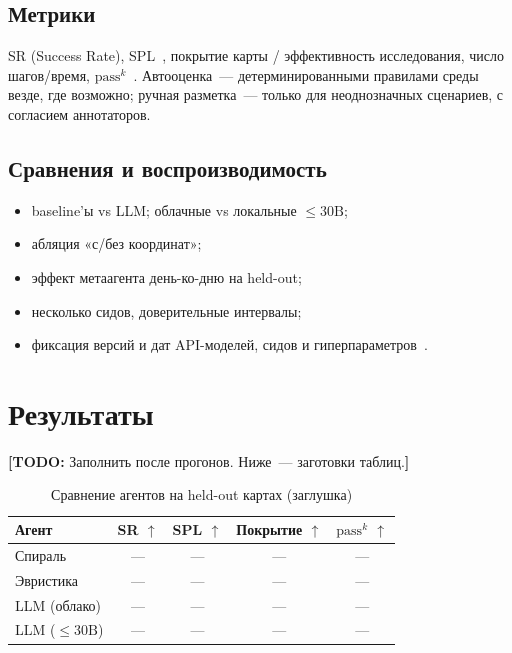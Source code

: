 \documentclass[11pt,a4paper]{article}
\newcommand{\todo}[1]{\textcolor{red!70!black}{\textbf{[TODO:} #1\textbf{]}}}
\begin{document}
\subsection{Метрики}

SR (Success Rate), SPL~\cite{anderson2018spl}, покрытие карты / эффективность
исследования, число шагов/время, \(\mathrm{pass}^k\)~\cite{taubench2024}.
Автооценка~--- детерминированными правилами среды везде, где возможно;
ручная разметка~--- только для неоднозначных сценариев, с согласием аннотаторов.

\subsection{Сравнения и воспроизводимость}

\begin{itemize}[leftmargin=*]
  \item baseline'ы vs LLM; облачные vs локальные \(\le 30\mathrm{B}\);
  \item абляция «с/без координат»;
  \item эффект метаагента день-ко-дню на held-out;
  \item несколько сидов, доверительные интервалы;
  \item фиксация версий и дат API-моделей, сидов и гиперпараметров~\cite{pineau2018reproducibility}.
\end{itemize}

\section{Результаты}
\label{sec:results}

\todo{Заполнить после прогонов. Ниже~--- заготовки таблиц.}

\begin{table}[ht]
\centering
\caption{Сравнение агентов на held-out картах (заглушка)}
\label{tab:main}
\begin{tabular}{lcccc}
\toprule
Агент & SR \(\uparrow\) & SPL \(\uparrow\) & Покрытие \(\uparrow\) & \(\mathrm{pass}^k\) \(\uparrow\) \\
\midrule
Спираль & --- & --- & --- & --- \\
Эвристика & --- & --- & --- & --- \\
LLM (облако) & --- & --- & --- & --- \\
LLM (\(\le 30\mathrm{B}\)) & --- & --- & --- & --- \\
\bottomrule
\end{tabular}
\end{table}
\end{document}
